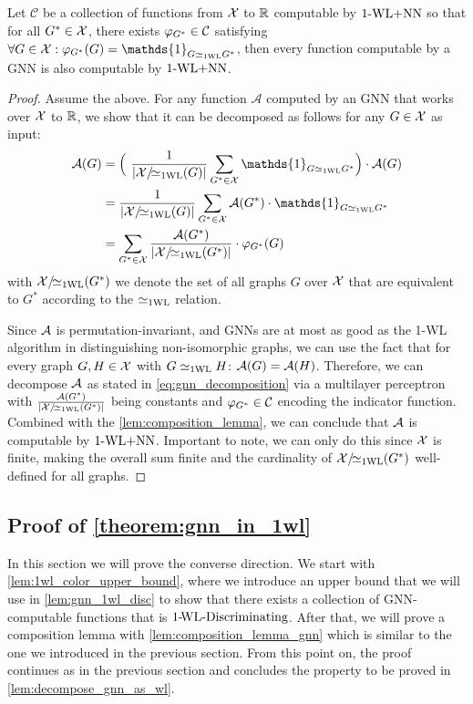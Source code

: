 \begin{lemma}\label{lem:decompose_gnn_as_wl}
    Let $\mathcal{C}$ be a collection of functions from $\mathcal{X}$ to $\mathbb{R}$ computable by $\text{1-WL+NN}$ so that for all $G^* \in \mathcal{X}$, there exists 
    $\varphi_{G^*} \in \mathcal{C}$ satisfying $\forall G \in \cX: \varphi_{G^*}(G) = \mathds{1}_{G \wliso G^*}$, then every function computable by a GNN is also computable by $\text{1-WL+NN}$.
\end{lemma}

\begin{proof}
    Assume the above. For any function $\mathcal{A}$ computed by an GNN that works over $\mathcal{X}$ to $\mathbb{R}$, we show that it can be decomposed as follows for any $G \in \mathcal{X}$ as input:
    \begin{align}\label{eq:gnn_decomposition}
        \mathcal{A}(G) &= \Bigl( \ \frac{1}{|\cX/\!{\wliso}(G)|}\sum_{G^* \in \cX} \mathds{1}_{G \wliso G^*} \Bigr) \cdot \mathcal{A}(G) \nonumber \\
        &= \frac{1}{|\cX/\!{\wliso}(G)|}\sum_{G^* \in \cX} \mathcal{A}(G^*) \cdot \mathds{1}_{G \wliso G^*} \nonumber \\
        &= \sum_{G^* \in \cX} \frac{\mathcal{A}(G^*)}{|\cX/\!{\wliso}(G^*)|}  \cdot \varphi_{G^*}(G)
    \end{align}
    with $\mathcal{X}/\!{\simeq_{\text{1WL}}}(G^*)$ we denote the set of all graphs $G$ over $\mathcal{X}$ that are equivalent to $G^*$ according to the $\simeq_{\text{1WL}}$ relation.

    Since $\mathcal{A}$ is permutation-invariant, and GNNs are at most as good as the 1-WL algorithm in distinguishing non-isomorphic graphs, we can use the fact that for every graph $G,H \in \mathcal{X}$ with $G \simeq_{\text{1WL}} H$: $\mathcal{A}(G) = \mathcal{A}(H)$. Therefore, we can decompose $\mathcal{A}$ as stated in \autoref{eq:gnn_decomposition} via a multilayer perceptron with $\frac{\mathcal{A}(G^*)}{|\mathcal{X}/\!{\simeq_{\text{1WL}}}(G^*)|}$ being constants and $\varphi_{G^*} \in \mathcal{C}$ encoding the indicator function. Combined with the \autoref{lem:composition_lemma}, we can conclude that $\mathcal{A}$ is computable by $\text{1-WL+NN}$. Important to note, we can only do this since $\mathcal{X}$ is finite, making the overall sum finite and the cardinality of $\mathcal{X}/\!{\simeq_{\text{1WL}}}(G^*)$ well-defined for all graphs.
\end{proof}

\subsection{Proof of \autoref{theorem:gnn_in_1wl}}
In this section we will prove the converse direction. We start with \cref{lem:1wl_color_upper_bound}, where we introduce an upper bound that we will use in \cref{lem:gnn_1wl_disc} to show that there exists a collection of GNN-computable functions that is $\text{1-\!WL-Discriminating}$. After that, we will prove a composition lemma with \cref{lem:composition_lemma_gnn} which is similar to the one we introduced in the previous section. From this point on, the proof continues as in the previous section and concludes the property to be proved in \cref{lem:decompose_gnn_as_wl}.

